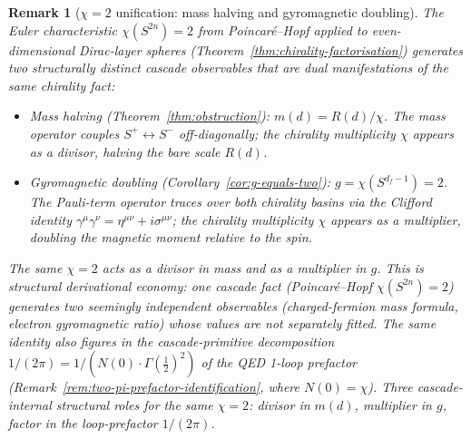 \documentclass[12pt,a4paper]{article}
\newtheorem*{remark}{Remark}
\begin{document}
\begin{remark}[$\chi = 2$ unification: mass halving and gyromagnetic doubling]\label{rem:chi-unification}
The Euler characteristic $\chi(S^{2n}) = 2$ from Poincar\'e--Hopf
applied to even-dimensional Dirac-layer spheres
(Theorem~\ref{thm:chirality-factorisation}) generates two
structurally distinct cascade observables that are dual
manifestations of the same chirality fact:
\begin{itemize}[nosep]
\item \emph{Mass halving} (Theorem~\ref{thm:obstruction}):
$m(d) = R(d)/\chi$. The mass operator couples
$S^+ \leftrightarrow S^-$ off-diagonally; the chirality
multiplicity $\chi$ appears as a \emph{divisor}, halving the
bare scale $R(d)$.
\item \emph{Gyromagnetic doubling}
(Corollary~\ref{cor:g-equals-two}):
$g = \chi(S^{d_f-1}) = 2$. The Pauli-term operator traces over
both chirality basins via the Clifford identity
$\gamma^\mu\gamma^\nu = \eta^{\mu\nu} + i\sigma^{\mu\nu}$; the
chirality multiplicity $\chi$ appears as a \emph{multiplier},
doubling the magnetic moment relative to the spin.
\end{itemize}
The same $\chi = 2$ acts as a divisor in mass and as a
multiplier in $g$. This is structural derivational economy: one
cascade fact (Poincar\'e--Hopf $\chi(S^{2n}) = 2$) generates two
seemingly independent observables (charged-fermion mass formula,
electron gyromagnetic ratio) whose values are not separately
fitted. The same identity also figures in the cascade-primitive
decomposition $1/(2\pi) = 1/(N(0)\cdot\Gamma(\tfrac{1}{2})^2)$
of the QED 1-loop prefactor
(Remark~\ref{rem:two-pi-prefactor-identification}, where
$N(0) = \chi$). Three cascade-internal structural roles for the
same $\chi = 2$: divisor in $m(d)$, multiplier in $g$, factor
in the loop-prefactor $1/(2\pi)$.
\end{remark}
\end{document}
